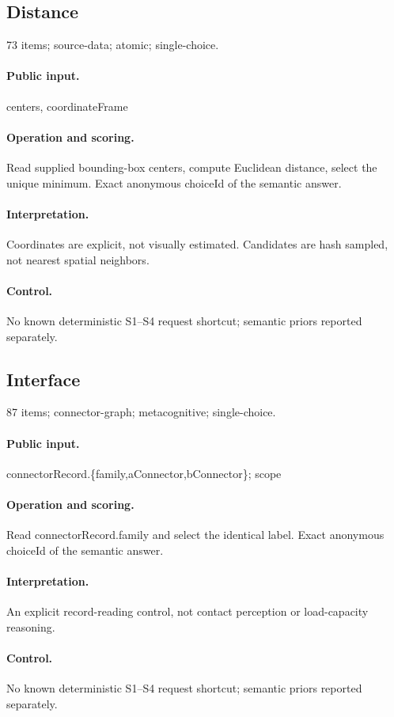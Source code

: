 \subsection{Distance}
73 items; source-data; atomic; single-choice.
\paragraph{Public input.}centers, coordinateFrame
\paragraph{Operation and scoring.}Read supplied bounding-box centers, compute Euclidean distance, select the unique minimum. Exact anonymous choiceId of the semantic answer.
\paragraph{Interpretation.}Coordinates are explicit, not visually estimated. Candidates are hash sampled, not nearest spatial neighbors.
\paragraph{Control.}No known deterministic S1--S4 request shortcut; semantic priors reported separately.
\subsection{Interface}
87 items; connector-graph; metacognitive; single-choice.
\paragraph{Public input.}connectorRecord.\{family,aConnector,bConnector\}; scope
\paragraph{Operation and scoring.}Read connectorRecord.family and select the identical label. Exact anonymous choiceId of the semantic answer.
\paragraph{Interpretation.}An explicit record-reading control, not contact perception or load-capacity reasoning.
\paragraph{Control.}No known deterministic S1--S4 request shortcut; semantic priors reported separately.
